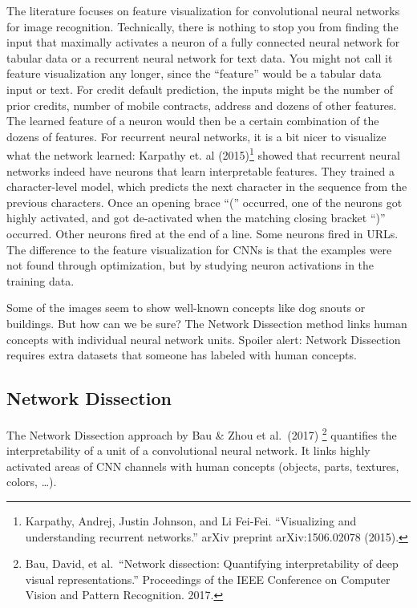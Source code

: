 \documentclass[
  12pt,
]{krantz}
\begin{document}
The literature focuses on feature visualization for convolutional neural networks for image recognition.
Technically, there is nothing to stop you from finding the input that maximally activates a neuron of a fully connected neural network for tabular data or a recurrent neural network for text data.
You might not call it feature visualization any longer, since the ``feature'' would be a tabular data input or text.
For credit default prediction, the inputs might be the number of prior credits, number of mobile contracts, address and dozens of other features.
The learned feature of a neuron would then be a certain combination of the dozens of features.
For recurrent neural networks, it is a bit nicer to visualize what the network learned:
Karpathy et. al (2015)\footnote{Karpathy, Andrej, Justin Johnson, and Li Fei-Fei. ``Visualizing and understanding recurrent networks.'' arXiv preprint arXiv:1506.02078 (2015).} showed that recurrent neural networks indeed have neurons that learn interpretable features.
They trained a character-level model, which predicts the next character in the sequence from the previous characters.
Once an opening brace ``('' occurred, one of the neurons got highly activated, and got de-activated when the matching closing bracket ``)'' occurred.
Other neurons fired at the end of a line.
Some neurons fired in URLs.
The difference to the feature visualization for CNNs is that the examples were not found through optimization, but by studying neuron activations in the training data.

Some of the images seem to show well-known concepts like dog snouts or buildings.
But how can we be sure?
The Network Dissection method links human concepts with individual neural network units.
Spoiler alert: Network Dissection requires extra datasets that someone has labeled with human concepts.

\hypertarget{network-dissection}{%
\subsection{Network Dissection}\label{network-dissection}}

The Network Dissection approach by Bau \& Zhou et al.~(2017) \footnote{Bau, David, et al.~``Network dissection: Quantifying interpretability of deep visual representations.'' Proceedings of the IEEE Conference on Computer Vision and Pattern Recognition. 2017.} quantifies the interpretability of a unit of a convolutional neural network.
It links highly activated areas of CNN channels with human concepts (objects, parts, textures, colors, \ldots).
\end{document}
